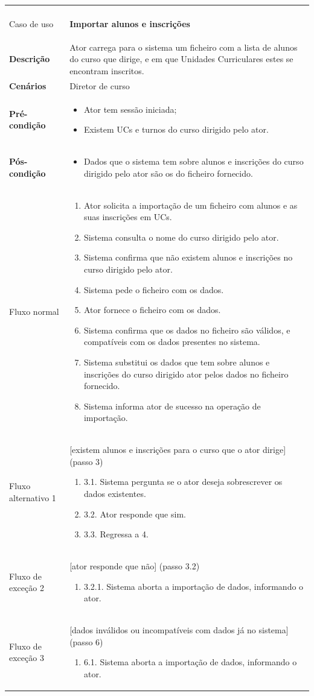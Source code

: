 \documentclass[12pt, a4paper]{article}
\newenvironment{condition}{
    \begin{itemize}[wide=0pt]
        \vspace{-0.2cm}
}{
        \vspace{-0.5cm}
    \end{itemize}
}
\newcommand\flow[1]{
    Fluxo normal &
    \vspace{-0.9cm}
    \singlespacing
    \begin{enumerate}[wide=0pt]
        #1
        \vspace{-0.3cm}
    \end{enumerate} \\ \hline
}
\newcommand\otherflow[3]{
    #1 &
    #2
    \singlespacing
    \begin{enumerate}[wide=0pt]
        #3
        \vspace{-0.3cm}
    \end{enumerate} \\ \hline
}
\newenvironment{usecase}[5]{
    \begin{longtable}{|>{\centering\arraybackslash\bf}m{3cm}|m{13cm}|}
        \multicolumn{2}{c}{\ldots Continua \ldots} \\
        \endfoot
        \endlastfoot

        \hline
        Caso de uso & \textbf{#1} \\

        \hline
        Descrição & #2 \\

        \hline
        Cenários & #3 \\

        \hline
        Pré-condição &
        \vspace{-0.8cm}
        \begin{condition}
            #4
        \end{condition} \\

        \hline
        Pós-condição &
        \vspace{-0.8cm}
        \begin{condition}
            #5
        \end{condition} \\

        \hline
}{
\end{longtable}
}
\begin{document}
\begin{usecase}
    {Importar alunos e inscrições}
    {
        Ator carrega para o sistema um ficheiro com a lista de alunos do curso que dirige, e em que
        Unidades Curriculares estes se encontram inscritos.
    }
    {Diretor de curso}
    {
        \item Ator tem sessão iniciada;
        \item Existem UCs e turnos do curso dirigido pelo ator.
    }
    {
        \item Dados que o sistema tem sobre alunos e inscrições do curso dirigido pelo ator são os
            do ficheiro fornecido.
    }

    \flow{
        \item Ator solicita a importação de um ficheiro com alunos e as suas inscrições em UCs.
        \item Sistema consulta o nome do curso dirigido pelo ator.
        \item Sistema confirma que não existem alunos e inscrições no curso dirigido pelo ator.
        \item Sistema pede o ficheiro com os dados.
        \item Ator fornece o ficheiro com os dados.
        \item Sistema confirma que os dados no ficheiro são válidos, e compatíveis com os dados
            presentes no sistema.
        \item Sistema substitui os dados que tem sobre alunos e inscrições do curso dirigido ator
            pelos dados no ficheiro fornecido.
        \item Sistema informa ator de sucesso na operação de importação.
    }

    \otherflow{Fluxo alternativo 1}
        {[existem alunos e inscrições para o curso que o ator dirige] (passo 3)}{

        \item[3.1.] Sistema pergunta se o ator deseja sobrescrever os dados existentes.
        \item[3.2.] Ator responde que sim.
        \item[3.3.] Regressa a 4.
    }

    \otherflow{Fluxo de exceção 2}{[ator responde que não] (passo 3.2)}{
        \item[3.2.1.] Sistema aborta a importação de dados, informando o ator.
    }

    \otherflow{Fluxo de exceção 3}
        {[dados inválidos ou incompatíveis com dados já no sistema] (passo 6)}{

        \item[6.1.] Sistema aborta a importação de dados, informando o ator.
    }
\end{usecase}
\end{document}
